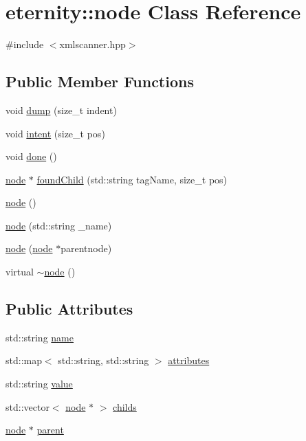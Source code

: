 \hypertarget{classeternity_1_1node}{}\section{eternity\+:\+:node Class Reference}
\label{classeternity_1_1node}


{\ttfamily \#include $<$xmlscanner.\+hpp$>$}

\subsection*{Public Member Functions}
\begin{DoxyCompactItemize}
\item 
void \hyperlink{classeternity_1_1node_a05e3159af39079b860ecb1f79d436bb1}{dump} (size\+\_\+t indent)
\item 
void \hyperlink{classeternity_1_1node_a35b42655fbf388f225c108f10bf46028}{intent} (size\+\_\+t pos)
\item 
void \hyperlink{classeternity_1_1node_acab0e3d272545fa2f535d11416119eaf}{done} ()
\item 
\hyperlink{classeternity_1_1node}{node} $\ast$ \hyperlink{classeternity_1_1node_a17c2bb4c6bb9594076e91935bd970224}{found\+Child} (std\+::string tag\+Name, size\+\_\+t pos)
\item 
\hyperlink{classeternity_1_1node_a8aab11da45324aff3018c80a3b489e47}{node} ()
\item 
\hyperlink{classeternity_1_1node_ad95115f371bc4d91338735dd1c168b77}{node} (std\+::string \+\_\+name)
\item 
\hyperlink{classeternity_1_1node_aee2ebc23f893fed356c9c4c123842283}{node} (\hyperlink{classeternity_1_1node}{node} $\ast$parentnode)
\item 
virtual \hyperlink{classeternity_1_1node_a068bb1cebdb8ce5682040fe3ada60718}{$\sim$node} ()
\end{DoxyCompactItemize}
\subsection*{Public Attributes}
\begin{DoxyCompactItemize}
\item 
std\+::string \hyperlink{classeternity_1_1node_aa58fec317429adb430f6d38b3660b69a}{name}
\item 
std\+::map$<$ std\+::string, std\+::string $>$ \hyperlink{classeternity_1_1node_af12d6ec498fd30def4c6b4f21fa181c7}{attributes}
\item 
std\+::string \hyperlink{classeternity_1_1node_a8daefdb6d1fffd05b08a2f8e07c9ffb4}{value}
\item 
std\+::vector$<$ \hyperlink{classeternity_1_1node}{node} $\ast$ $>$ \hyperlink{classeternity_1_1node_ac1d7dfa57dd7ad2c13f0d6e0594d7e7f}{childs}
\item 
\hyperlink{classeternity_1_1node}{node} $\ast$ \hyperlink{classeternity_1_1node_a11a3dc9c5a20a7cae619e7bf69e09131}{parent}
\end{DoxyCompactItemize}



